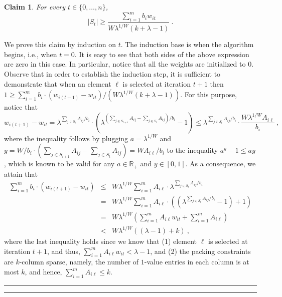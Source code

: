 \documentclass[11pt]{article}
\theoremstyle{plain}
\newtheorem{claim}[theorem]{Claim}
\theoremstyle{definition}
\newcommand{\qedsymb}{\hfill{\rule{2mm}{2mm}}}
\renewenvironment{proof}{\begin{trivlist} \item[\hspace{\labelsep}{\bf \noindent Proof.\/}] }{\qedsymb\end{trivlist}}\newenvironment{proofof}[1]{\begin{trivlist} \item[\hspace{\labelsep}{\bf \noindent Proof of #1.\/}] }{\qedsymb\end{trivlist}}\newenvironment{MyEqn}[1]{\setlength\arraycolsep{2pt}\begin{eqnarray*} #1}{\end{eqnarray*}}
\newcommand{\bbR}{\mathbb{R}}
\begin{document}
\begin{proofof}{Theorem~\ref{th:MainResult4}}
\begin{claim}
For every $t \in \{0, \ldots, n\}$,
$$
|S_t| \geq \frac{\sum_{i=1}^{m} b_i w_{it}}{W \lambda^{1/W} (k +
\lambda - 1)} \ .
$$
\end{claim}
\begin{proof}
We prove this claim by induction on $t$. The induction base is
when the algorithm begins, i.e., when $t = 0$. It is easy to see
that both sides of the above expression are zero in this case. In
particular, notice that all the weights are initialized to $0$.
Observe that in order to establish the induction step, it is
sufficient to demonstrate that when an element $\ell$ is selected
at iteration $t+1$ then $1 \geq \sum_{i=1}^{m} b_i \cdot
(w_{i(t+1)} - w_{it}) / (W \lambda^{1/W} (k + \lambda - 1))$. For
this purpose, notice that
$$
w_{i(t+1)} - w_{it} = \lambda^{\sum_{j \in S_t} A_{ij} / b_i}
\cdot \left(\lambda^{\left(\sum_{j \in S_{t+1}} A_{ij} - \sum_{j
\in S_t} A_{ij}\right) / b_i} - 1 \right) \leq \lambda^{\sum_{j
\in S_t} A_{ij} / b_i} \cdot \frac{W \lambda^{1/W}
A_{i\ell}}{b_{i}} \ ,
$$
where the inequality follows by plugging $a = \lambda^{1/W}$ and
$y = W / b_i \cdot (\sum_{j \in S_{t+1}} A_{ij} - \sum_{j \in S_t}
A_{ij}) = W A_{i\ell} / b_i$ to the inequality $a^y -1 \leq ay$,
which is known to be valid for any $a \in \bbR_+$ and $y \in
[0,1]$. As a consequence, we attain that
\begin{eqnarray*}
\sum_{i=1}^{m} b_i \cdot (w_{i(t+1)} - w_{it}) & \leq & W \lambda^{1/W} \sum_{i=1}^{m} A_{i \ell} \cdot  \lambda^{\sum_{j \in S_t} A_{ij} /b_i} \\
& = & W \lambda^{1/W} \sum_{i=1}^{m} A_{i \ell} \cdot \left( (\lambda^{\sum_{j \in S_t} A_{ij} / b_i} - 1) + 1 \right)\\
& = & W \lambda^{1/W} \left(\sum_{i=1}^{m} A_{i \ell} w_{it} + \sum_{i=1}^{m} A_{i \ell}\right) \\
& < & W \lambda^{1/W} \left((\lambda - 1) + k\right) \ ,
\end{eqnarray*}
where the last inequality holds since we know that (1) element
$\ell$ is selected at iteration $t+1$, and thus, $\sum_{i=1}^{m}
A_{i \ell} w_{it} < \lambda - 1$, and (2) the packing constraints
are $k$-column sparse, namely, the number of $1$-value entries in
each column is at most $k$, and hence, $\sum_{i=1}^{m} A_{i \ell}
\leq k$.
\end{proof}


\end{proofof}
\end{document}
